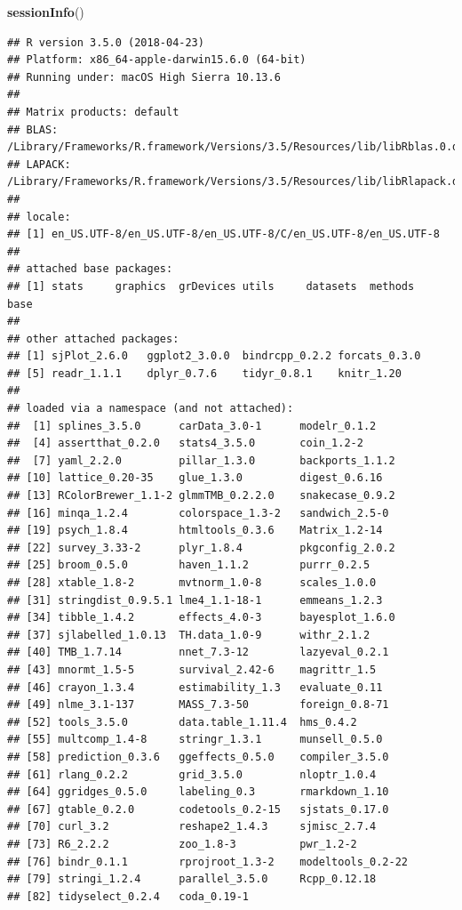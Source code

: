 \documentclass[]{article}
\newenvironment{Shaded}{\begin{snugshade}}{\end{snugshade}}
\newcommand{\KeywordTok}[1]{\textcolor[rgb]{0.13,0.29,0.53}{\textbf{#1}}}
\newcommand{\NormalTok}[1]{#1}
\begin{document}
\begin{Shaded}
\begin{Highlighting}[]
\KeywordTok{sessionInfo}\NormalTok{()}
\end{Highlighting}
\end{Shaded}

\begin{verbatim}
## R version 3.5.0 (2018-04-23)
## Platform: x86_64-apple-darwin15.6.0 (64-bit)
## Running under: macOS High Sierra 10.13.6
## 
## Matrix products: default
## BLAS: /Library/Frameworks/R.framework/Versions/3.5/Resources/lib/libRblas.0.dylib
## LAPACK: /Library/Frameworks/R.framework/Versions/3.5/Resources/lib/libRlapack.dylib
## 
## locale:
## [1] en_US.UTF-8/en_US.UTF-8/en_US.UTF-8/C/en_US.UTF-8/en_US.UTF-8
## 
## attached base packages:
## [1] stats     graphics  grDevices utils     datasets  methods   base     
## 
## other attached packages:
## [1] sjPlot_2.6.0   ggplot2_3.0.0  bindrcpp_0.2.2 forcats_0.3.0 
## [5] readr_1.1.1    dplyr_0.7.6    tidyr_0.8.1    knitr_1.20    
## 
## loaded via a namespace (and not attached):
##  [1] splines_3.5.0      carData_3.0-1      modelr_0.1.2      
##  [4] assertthat_0.2.0   stats4_3.5.0       coin_1.2-2        
##  [7] yaml_2.2.0         pillar_1.3.0       backports_1.1.2   
## [10] lattice_0.20-35    glue_1.3.0         digest_0.6.16     
## [13] RColorBrewer_1.1-2 glmmTMB_0.2.2.0    snakecase_0.9.2   
## [16] minqa_1.2.4        colorspace_1.3-2   sandwich_2.5-0    
## [19] psych_1.8.4        htmltools_0.3.6    Matrix_1.2-14     
## [22] survey_3.33-2      plyr_1.8.4         pkgconfig_2.0.2   
## [25] broom_0.5.0        haven_1.1.2        purrr_0.2.5       
## [28] xtable_1.8-2       mvtnorm_1.0-8      scales_1.0.0      
## [31] stringdist_0.9.5.1 lme4_1.1-18-1      emmeans_1.2.3     
## [34] tibble_1.4.2       effects_4.0-3      bayesplot_1.6.0   
## [37] sjlabelled_1.0.13  TH.data_1.0-9      withr_2.1.2       
## [40] TMB_1.7.14         nnet_7.3-12        lazyeval_0.2.1    
## [43] mnormt_1.5-5       survival_2.42-6    magrittr_1.5      
## [46] crayon_1.3.4       estimability_1.3   evaluate_0.11     
## [49] nlme_3.1-137       MASS_7.3-50        foreign_0.8-71    
## [52] tools_3.5.0        data.table_1.11.4  hms_0.4.2         
## [55] multcomp_1.4-8     stringr_1.3.1      munsell_0.5.0     
## [58] prediction_0.3.6   ggeffects_0.5.0    compiler_3.5.0    
## [61] rlang_0.2.2        grid_3.5.0         nloptr_1.0.4      
## [64] ggridges_0.5.0     labeling_0.3       rmarkdown_1.10    
## [67] gtable_0.2.0       codetools_0.2-15   sjstats_0.17.0    
## [70] curl_3.2           reshape2_1.4.3     sjmisc_2.7.4      
## [73] R6_2.2.2           zoo_1.8-3          pwr_1.2-2         
## [76] bindr_0.1.1        rprojroot_1.3-2    modeltools_0.2-22 
## [79] stringi_1.2.4      parallel_3.5.0     Rcpp_0.12.18      
## [82] tidyselect_0.2.4   coda_0.19-1
\end{verbatim}
\end{document}
